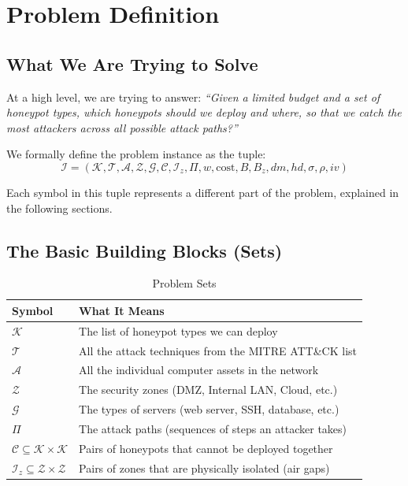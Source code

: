 \documentclass[journal]{IEEEtran}
\newcommand{\calK}{\mathcal{K}}
\newcommand{\calT}{\mathcal{T}}
\newcommand{\calA}{\mathcal{A}}
\newcommand{\calZ}{\mathcal{Z}}
\newcommand{\calG}{\mathcal{G}}
\newcommand{\calC}{\mathcal{C}}
\newcommand{\calPi}{\mathcal{\Pi}}
\begin{document}
\section{Problem Definition}
\label{sec:problem}

\subsection{What We Are Trying to Solve}

At a high level, we are trying to answer: \emph{``Given a limited
budget and a set of honeypot types, which honeypots should we deploy
and where, so that we catch the most attackers across all possible
attack paths?''}

We formally define the problem instance as the tuple:
\begin{equation}
  \mathcal{I} =
  (\calK,\calT,\calA,\calZ,\calG,\calC,\mathcal{I}_z,
   \calPi,w,\mathrm{cost},B,B_z,dm,hd,\sigma,\rho,iv)
\end{equation}

Each symbol in this tuple represents a different part of the
problem, explained in the following sections.

\subsection{The Basic Building Blocks (Sets)}

\begin{table}[htbp]
\caption{Problem Sets}
\label{tab:sets}
\centering
\renewcommand{\arraystretch}{1.2}
\begin{tabular}{@{}ll@{}}
\toprule
\textbf{Symbol} & \textbf{What It Means} \\
\midrule
$\calK$ & The list of honeypot types we can deploy \\
$\calT$ & All the attack techniques from the MITRE ATT\&CK list \\
$\calA$ & All the individual computer assets in the network \\
$\calZ$ & The security zones (DMZ, Internal LAN, Cloud, etc.) \\
$\calG$ & The types of servers (web server, SSH, database, etc.) \\
$\calPi$ & The attack paths (sequences of steps an attacker takes) \\
$\calC \subseteq \calK \times \calK$ & Pairs of honeypots that cannot be deployed together \\
$\mathcal{I}_z \subseteq \calZ \times \calZ$ & Pairs of zones that are physically isolated (air gaps) \\
\bottomrule
\end{tabular}
\end{table}
\end{document}
